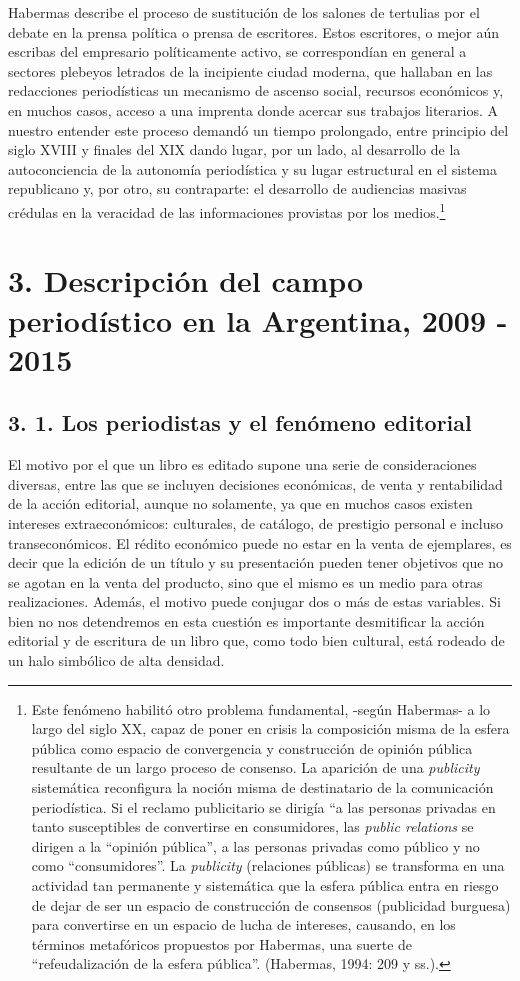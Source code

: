 {Habermas describe el proceso de sustitución de los salones de tertulias por el debate en la prensa política o prensa de escritores. Estos escritores, o mejor aún escribas del empresario políticamente activo, se correspondían en general a sectores plebeyos letrados de la incipiente ciudad moderna, que hallaban en las redacciones periodísticas un mecanismo de ascenso social, recursos económicos y, en muchos casos, acceso a una imprenta donde acercar sus trabajos literarios. A nuestro entender este proceso demandó un tiempo prolongado, entre principio del siglo XVIII y finales del XIX dando lugar, por un lado, al desarrollo de la autoconciencia de la autonomía periodística y su lugar estructural en el sistema republicano y, por otro, su contraparte: el desarrollo de audiencias masivas crédulas en la veracidad de las informaciones provistas por los medios.\footnote{Este fenómeno habilitó otro problema fundamental, -según Habermas- a lo largo del siglo XX, capaz de poner en crisis la composición misma de la esfera pública como espacio de convergencia y construcción de opinión pública resultante de un largo proceso de consenso. La aparición de una \emph{publicity} sistemática reconfigura la noción misma de destinatario de la comunicación periodística. Si el reclamo publicitario se dirigía ``a las personas privadas en tanto susceptibles de convertirse en consumidores, las \emph{public relations} se dirigen a la ``opinión pública'', a las personas privadas como público y no como ``consumidores''. La \emph{publicity} (relaciones públicas) se transforma en una actividad tan permanente y sistemática que la esfera pública entra en riesgo de dejar de ser un espacio de construcción de consensos (publicidad burguesa) para convertirse en un espacio de lucha de intereses, causando, en los términos metafóricos propuestos por Habermas, una suerte de ``refeudalización de la esfera pública''. (Habermas, 1994: 209 y ss.).}

\chapter{3. Descripción del campo periodístico en la Argentina, 2009 - 2015}

\section{3. 1. Los periodistas y el fenómeno editorial}

El motivo por el que un libro es editado supone una serie de consideraciones diversas, entre las que se incluyen decisiones económicas, de venta y rentabilidad de la acción editorial, aunque no solamente, ya que en muchos casos existen intereses extraeconómicos: culturales, de catálogo, de prestigio personal e incluso transeconómicos. El rédito económico puede no estar en la venta de ejemplares, es decir que la edición de un título y su presentación pueden tener objetivos que no se agotan en la venta del producto, sino que el mismo es un medio para otras realizaciones. Además, el motivo puede conjugar dos o más de estas variables. Si bien no nos detendremos en esta cuestión es importante desmitificar la acción editorial y de escritura de un libro que, como todo bien cultural, está rodeado de un halo simbólico de alta densidad.

}
